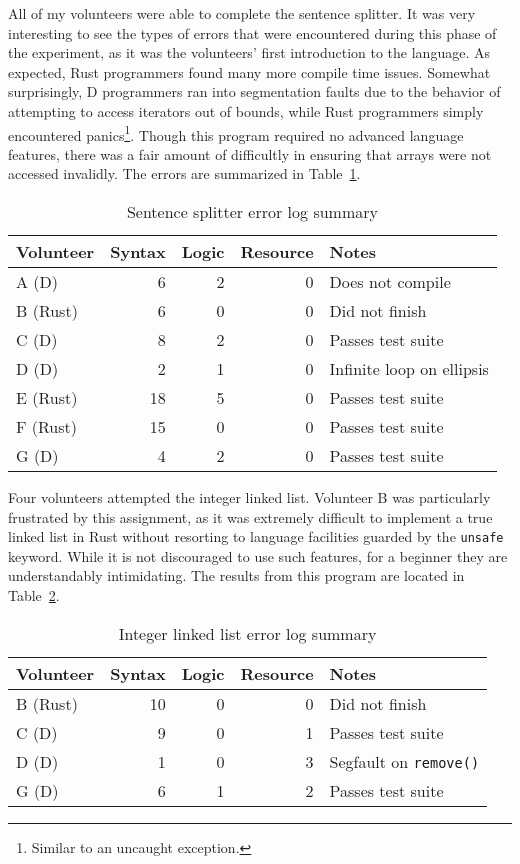 \documentclass[finalcopy]{srpaper}
\begin{document}
All of my volunteers were able to complete the sentence splitter. It was very
interesting to see the types of errors that were encountered during this phase
of the experiment, as it was the volunteers' first introduction to the
language. As expected, Rust programmers found many more compile time issues.
Somewhat surprisingly, D programmers ran into segmentation faults due to the
behavior of attempting to access iterators out of bounds, while Rust
programmers simply encountered panics\footnote{Similar to an uncaught
exception.}. Though this program required no advanced language features, there
was a fair amount of difficultly in ensuring that arrays were not accessed
invalidly. The errors are summarized in Table~\ref{tab:sentencesplitter}.

\begin{table}[h]
\centering
\begin{tabular}{lrrrp{5cm}}
\toprule
Volunteer & Syntax & Logic & Resource & Notes \\
\midrule
A (D) & 6 & 2 & 0 & Does not compile \\
B (Rust) & 6 & 0 & 0 & Did not finish \\
C (D) & 8 & 2 & 0 & Passes test suite \\
D (D) & 2 & 1 & 0 & Infinite loop on ellipsis \\
E (Rust) & 18 & 5 & 0 & Passes test suite \\
F (Rust) & 15 & 0 & 0 & Passes test suite \\
G (D) & 4 & 2 & 0 & Passes test suite \\
\bottomrule
\end{tabular}
\caption{Sentence splitter error log summary}
\label{tab:sentencesplitter}
\end{table}

Four volunteers attempted the integer linked list. Volunteer B was
particularly frustrated by this assignment, as it was extremely difficult to
implement a true linked list in Rust without resorting to language facilities
guarded by the \texttt{unsafe} keyword. While it is not discouraged to use
such features, for a beginner they are understandably intimidating. The
results from this program are located in Table~\ref{tab:intlinkedlist}.

\begin{table}[h]
\centering
\begin{tabular}{lrrrp{5cm}}
\toprule
Volunteer & Syntax & Logic & Resource & Notes \\
\midrule
B (Rust) & 10 & 0 & 0 & Did not finish \\
C (D) & 9 & 0 & 1 & Passes test suite \\
D (D) & 1 & 0 & 3 & Segfault on \texttt{remove()} \\
G (D) & 6 & 1 & 2 & Passes test suite \\
\bottomrule
\end{tabular}
\caption{Integer linked list error log summary}
\label{tab:intlinkedlist}
\end{table}
\end{document}
